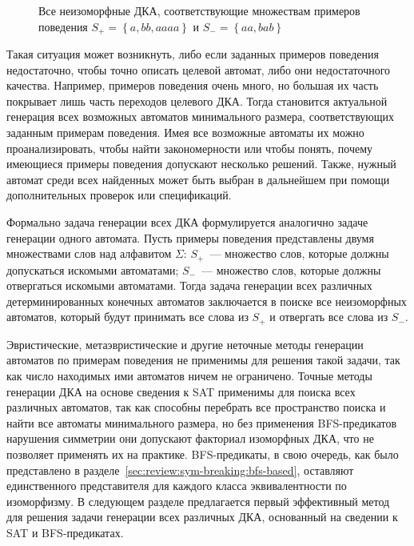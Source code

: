 \begin{figure}[ht]
  \centering
  \ifafour
    
  \else
    
  \fi
  \caption{Все неизоморфные ДКА, соответствующие множествам примеров поведения $S_{+} = \left\{a, bb, aaaa\right\}$ и $S_{-}=\left\{aa, bab\right\}$}
  \label{img:find-all}
\end{figure}

Такая ситуация может возникнуть, либо если заданных примеров поведения недостаточно, чтобы точно описать целевой автомат, либо они недостаточного качества.
Например, примеров поведения очень много, но большая их часть покрывает лишь часть переходов целевого ДКА.
Тогда становится актуальной генерация всех возможных автоматов минимального размера, соответствующих заданным примерам поведения.
Имея все возможные автоматы их можно проанализировать, чтобы найти закономерности или чтобы понять, почему имеющиеся примеры поведения допускают несколько решений.
Также, нужный автомат среди всех найденных может быть выбран в дальнейшем при помощи дополнительных проверок или спецификаций.

Формально задача генерации всех ДКА формулируется аналогично задаче генерации одного автомата.
Пусть примеры поведения представлены двумя множествами слов над алфавитом $\Sigma$: $S_{+}$~--- множество слов, которые должны допускаться искомыми автоматами; $S_{-}$~--- множество слов, которые должны отвергаться искомыми автоматами.
Тогда задача генерации всех различных детерминированных конечных автоматов заключается в поиске все неизоморфных автоматов, который будут принимать все слова из $S_{+}$ и отвергать все слова из $S_{-}$.

Эвристические, метаэвристические и другие неточные методы генерации автоматов по примерам поведения не применимы для решения такой задачи, так как число находимых ими автоматов ничем не ограничено.
Точные методы генерации ДКА на основе сведения к SAT применимы для поиска всех различных автоматов, так как способны перебрать все пространство поиска и найти все автоматы минимального размера, но без применения BFS-предикатов нарушения симметрии они допускают факториал изоморфных ДКА, что не позволяет применять их на практике.
BFS-предикаты, в свою очередь, как было представлено в разделе~\ref{sec:review:sym-breaking:bfs-based}, оставляют единственного представителя для каждого класса эквивалентности по изоморфизму.
В следующем разделе предлагается первый эффективный метод для решения задачи генерации всех различных ДКА, основанный на сведении к SAT и BFS-предикатах.

